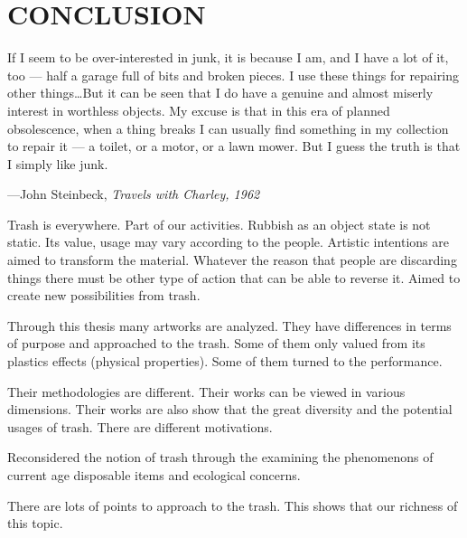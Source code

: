 \chapter{CONCLUSION}





%
%
\begin{singlespace}
\epigraph{If I seem to be over-interested in junk, it is because I am, and I have a lot of it, too --- half a garage full of bits and broken pieces. I use these things for repairing other things\ldots But it can be seen that I do have a genuine and almost miserly interest in worthless objects. My excuse is that in this era of planned obsolescence, when a thing breaks I can usually find something in my collection to repair it --- a toilet, or a motor, or a lawn mower. But I guess the truth is that I simply like junk.}{\hfill---John Steinbeck, \textit{Travels with Charley, 1962}}
\end{singlespace}




Trash is everywhere. Part of our activities. Rubbish as an object state is not static. Its value, usage may vary according to the people. Artistic intentions are aimed to transform the material. Whatever the reason that people are discarding things there must be other type of action that can be able to reverse it. Aimed to create new possibilities from trash.





%
%
Through this thesis many artworks are analyzed. They have differences in terms of purpose and approached to the trash. Some of them only valued from its plastics effects (physical properties). Some of them turned to the performance. 

Their methodologies are different. Their works can be viewed in various dimensions. Their works are also show that the great diversity and the potential usages of trash. 
There are different motivations. 

Reconsidered the notion of trash through the examining the phenomenons of current age disposable items and ecological concerns. 

There are lots of points to approach to the trash. This shows that our richness of this topic. 


